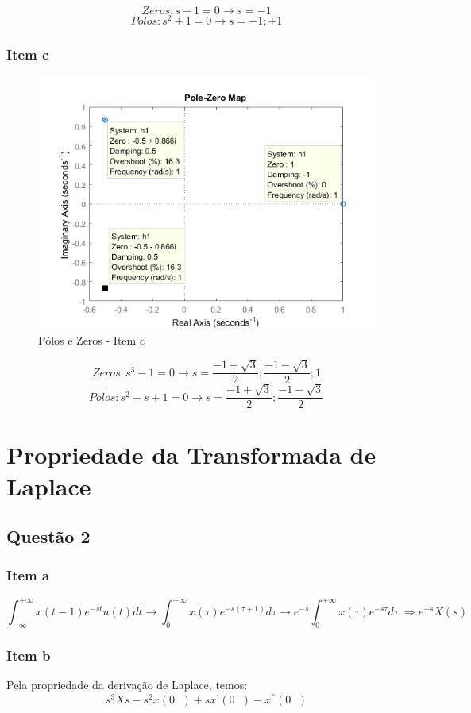 \documentclass[a4paper, 12pt]{article}
\begin{document}
        \[Zeros: s + 1 = 0 \rightarrow s = -1\]
        \[Polos:  s^{2} + 1 = 0 \rightarrow s = {-1; +1}\]
        \newpage
        \subsubsection{Item c}
		\begin{figure}[!ht]
			\centering
			\includegraphics[scale=0.7]{img/Q1c.png}
			\caption{P\'{o}los e Zeros - Item c}	
		\end{figure}	   
		
		\[Zeros: s^{3} - 1 = 0 \rightarrow s = {\frac{-1 + \sqrt{3}}{2}; \frac{-1 - \sqrt{3}}{2}; 1}\]
		\[Polos:  s^{2} + s + 1 = 0 \rightarrow s = {\frac{-1 + \sqrt{3}}{2}; \frac{-1 - \sqrt{3}}{2}}\]        
\section{Propriedade da Transformada de Laplace}
    \subsection{Quest\~{a}o 2}
        \subsubsection{Item a}
			\[\int_{-\infty}^{+\infty} x(t-1)e^{-st}u(t)dt \rightarrow \int_{0}^{+\infty}x(\tau)e^{-s(\tau + 1)}d\tau \rightarrow e^{-s}\int_{0}^{+\infty}x(\tau)e^{-s\tau}d\tau\ \Rightarrow e^{-s}X(s)\]
        \subsubsection{Item b}
        Pela propriedade da derivação de Laplace, temos:
        \[s^3X{s} - s^2x(0^{-}) + sx^{'}(0^{-}) - x^{''}(0^{-})\]
        \newpage
\end{document}
